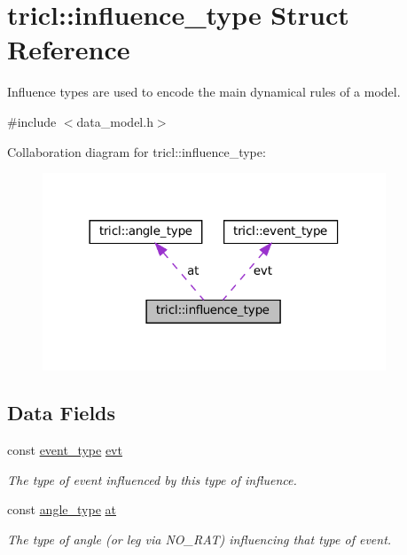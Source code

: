 \hypertarget{structtricl_1_1influence__type}{}\section{tricl\+:\+:influence\+\_\+type Struct Reference}
\label{structtricl_1_1influence__type}


Influence types are used to encode the main dynamical rules of a model.  




{\ttfamily \#include $<$data\+\_\+model.\+h$>$}



Collaboration diagram for tricl\+:\+:influence\+\_\+type\+:\nopagebreak
\begin{figure}[H]
\begin{center}
\leavevmode
\includegraphics[width=290pt]{d0/dba/structtricl_1_1influence__type__coll__graph}
\end{center}
\end{figure}
\subsection*{Data Fields}
\begin{DoxyCompactItemize}
\item 
\mbox{\label{structtricl_1_1influence__type_a9e3a80224b266e0ff8041644e372fe19}} 
const \hyperlink{structtricl_1_1event__type}{event\+\_\+type} \hyperlink{structtricl_1_1influence__type_a9e3a80224b266e0ff8041644e372fe19}{evt}
\begin{DoxyCompactList}\small\item\em The type of event influenced by this type of influence. \end{DoxyCompactList}\item 
\mbox{\label{structtricl_1_1influence__type_a9d6fecd13fbb3e7b0686556d80b3b537}} 
const \hyperlink{structtricl_1_1angle__type}{angle\+\_\+type} \hyperlink{structtricl_1_1influence__type_a9d6fecd13fbb3e7b0686556d80b3b537}{at}
\begin{DoxyCompactList}\small\item\em The type of angle (or leg via N\+O\+\_\+\+R\+AT) influencing that type of event. \end{DoxyCompactList}\end{DoxyCompactItemize}
